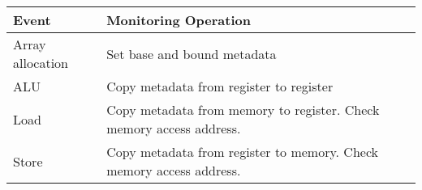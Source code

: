 

\begin{tabular}{|l|l|}
\hline

 {\bf Event} & {\bf Monitoring Operation} \\ \hline \hline

 Array allocation & Set base and bound metadata \\ \hline
 ALU & Copy metadata from register to register \\  \hline
 Load & Copy metadata from memory to register. Check memory access address. \\ \hline
 Store & Copy metadata from register to memory. Check memory access address. \\ 
\hline%

% 

\end{tabular}
